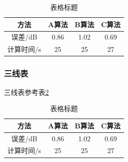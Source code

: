 \documentclass{nwputhesis}
\begin{document}
\begin{table}[H]
\fontsize{10.5bp}{1.25}
\caption{表格标题}
\centering\label{table1} 
\begin{tabular}{|c|c|c|c|}	
\hline %
    方法 & A算法 & B算法 & C算法 \\ \hline
    误差/dB & 0.86 & 1.02 & 0.69 \\ \hline
    计算时间/s & 25 & 25 & 27 \\ \hline
\end{tabular}
\end{table}

\subsubsection{三线表}
三线表参考表\ref{table3}
\begin{table}[H]
\fontsize{10.5bp}{1.25}
\caption{表格标题}
\centering\label{table3} 
\begin{tabular}{cccc}	
\toprule[1.5pt]
    方法 & A算法 & B算法 & C算法 \\ 
    \toprule[1.5pt]
    误差/dB & 0.86 & 1.02 & 0.69 \\ 
    计算时间/s & 25 & 25 & 27 \\ 
    \toprule[1.5pt]
\end{tabular}
\end{table}
\end{document}
